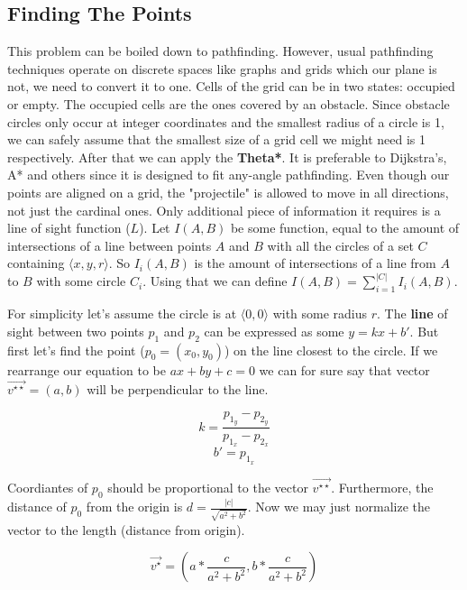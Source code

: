\documentclass[12pt, titlepage]{article}
\begin{document}
\subsection{Finding The Points}
This problem can be boiled down to pathfinding. However, usual pathfinding
techniques operate on discrete spaces like graphs and grids which our plane
is not, we need to convert it to one. Cells of the grid can be in two states:
occupied or empty. The occupied cells are the ones covered by an obstacle. 
Since obstacle circles only occur at integer coordinates and the smallest
radius of a circle is 1, we can safely assume that the smallest size of a grid
cell we might need is 1 respectively. After that we can apply the \textbf{Theta*}.
It is preferable to Dijkstra's, A* and others since it is designed to fit
any-angle pathfinding. Even though our points are aligned on a grid,
the "projectile" is allowed to move in all directions, not just the cardinal ones. 
Only additional piece of information it requires is a line of sight function ($L$).
Let $I(A, B)$ be some function, equal to the amount of intersections of a 
line between points $A$ and $B$  with all the circles of a set $C$ containing 
$\langle x, y, r \rangle$. So $I_i(A, B)$ is the amount of intersections
of a line from $A$ to $B$ with some circle $C_i$. 
Using that we can define $I(A, B) = \sum_{i=1}^{|C|}I_i(A, B)$.

For simplicity let's assume the circle is at $\langle 0, 0 \rangle$ with
some radius $r$. The \textbf{line} of sight between two points $p_1$ and $p_2$
can be expressed as some $y = kx + b'$. 
But first let's find the point ($p_0 = (x_0, y_0)$) on the line closest to the circle.
If we rearrange our equation to be $ax + by + c = 0$ we can for sure say that 
vector $\vec{v^{\star\star}} = (a, b)$ will be perpendicular to the line.

\begin{equation}
    k = \frac{p_{1_y} - p_{2_y}}{p_{1_x} - p_{2_x}}
\end{equation}
\begin{equation}
    b' = p_{1_x}
\end{equation}

Coordiantes of $p_0$ should be proportional to the vector $\vec{v^{\star\star}}$. 
Furthermore, the distance
of $p_0$ from the origin is $d = \frac{|c|}{\sqrt{a^2 + b^2}}$.
Now we may just normalize the vector to the length (distance from origin).

\begin{equation}
    \vec{v^\star}=\left(a * \frac{c}{a^2 + b^2}, b * \frac{c}{a^2 + b^2}\right)
\end{equation}
\end{document}
